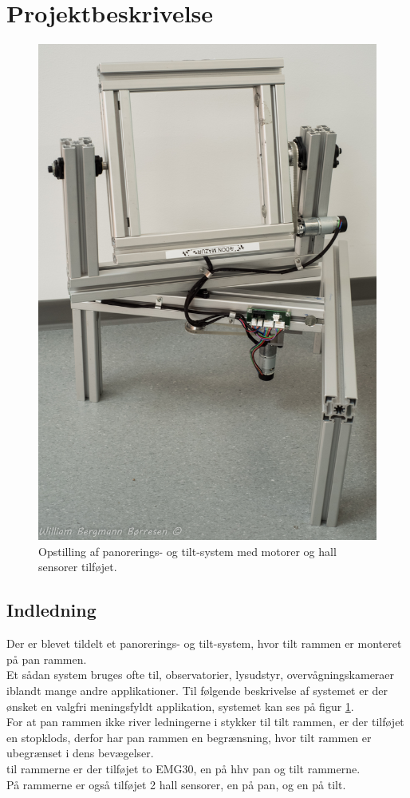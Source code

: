 \section{Projektbeskrivelse}
\begin{figure}
	\centering
		\includegraphics[scale=0.2]{Billeder/opstilling.jpg}
\caption{Opstilling af panorerings- og tilt-system med motorer og hall sensorer tilføjet.}
\label{fig:Opstilling}
\end{figure}

\subsection{Indledning}
Der er blevet tildelt et panorerings- og tilt-system, hvor tilt rammen er monteret på pan rammen.\\
Et sådan system bruges ofte til, observatorier, lysudstyr, overvågningskameraer iblandt mange andre applikationer.
Til følgende beskrivelse af systemet er der ønsket en valgfri meningsfyldt applikation, systemet kan ses på figur \ref{fig:Opstilling}.\\
For at pan rammen ikke river ledningerne i stykker til tilt rammen, er der tilføjet en stopklods, derfor har pan rammen en begrænsning, hvor tilt rammen er ubegrænset i dens bevægelser.\\
til rammerne er der tilføjet to EMG30\cite{emg30Data}, en på hhv pan og tilt rammerne.\\
På rammerne er også tilføjet 2 hall sensorer, en på pan, og en på tilt. 


